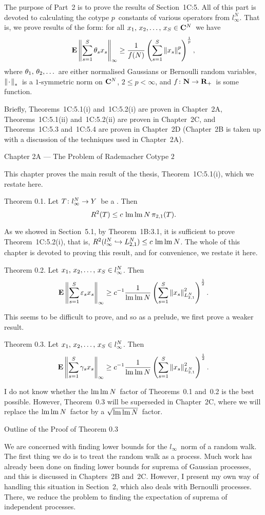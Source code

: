 The purpose of Part~2 is to prove the results of Section~1C:5. All
of this part
is devoted to calculating the cotype $p$\ constants of various operators
from
$l_\infty^N$. That is, we prove results of the form: for all $\xS\in\C^N$\
we have
$$ {\bf E} \left\| \sum_{s=1}^S \theta_s x_s \right\|_\infty \ge {1\over f(N)}
   \left( \sum_{s=1}^S \left\| x_s \right\|_*^p \right)^{1\over p} ,$$
where $\thetalist$\ are either normalised Gaussians or Bernoulli
random
variables, $\left\| \kern0.8pt\cdot\kern0.8pt \right\|_*$\ is a $1$-symmetric norm on ${\bf C}^N$, $2\le
p<\infty$, and $f\colon{\bf N}\to{\bf R}_+$\ is some function.
 
Briefly, Theorems~1C:5.1(i) and~1C:5.2(i) are proven in Chapter~2A,
Theorems~1C:5.1(ii) and~1C:5.2(ii) are proven in Chapter~2C, and
Theorems~1C:5.3 and~1C:5.4 are proven in Chapter~2D (Chapter~2B is
taken up
with a discussion of the techniques used in Chapter~2A).
 
\vfill
\eject
 
\beginsection Chapter 2A --- The Problem of Rademacher Cotype $2$
 
This chapter proves the main result of the thesis,
Theorem~1C:5.1(i), which we restate here.
 
\proclaim Theorem 0.1. Let $T\colon l_\infty^N\to Y$\ be a \blotaBs. Then
$$ R^2(T) \le c \,\mathop{\rm lm}\nolimits\mathop{\rm lm}\nolimits N\, \pi_{2,1}(T) .$$
 
\noindent
As we showed in Section~5.1, by Theorem~1B:3.1, it is sufficient
to prove
Theorem~1C:5.2(i), that is, $R^2( l_\infty^N \hookrightarrow
L_{2,1}^N) \le c\, \mathop{\rm lm}\nolimits\mathop{\rm lm}\nolimits N$. The whole of this chapter is devoted
to proving
this result, and for convenience, we restate it here.
 
\proclaim Theorem 0.2. Let $\xS\in\linftyN$. Then
$$ {\bf E} \left\| \sum_{s=1}^S \varepsilon_s x_s \right\|_\infty
   \ge c^{-1}
   {1\over \mathop{\rm lm}\nolimits\mathop{\rm lm}\nolimits N} \left( \sum_{s=1}^S \left\| x_s \right\|_{L_{2,1}^N}^2 \right)^{1\over2} .$$
 
\noindent
This seems to be difficult to prove, and so as a prelude, we first
prove a
weaker result.
 
\proclaim Theorem 0.3. Let $\xS\in\linftyN$. Then
$$ {\bf E} \left\| \sum_{s=1}^S \gamma_s x_s \right\|_\infty
   \ge c^{-1}
   {1\over \mathop{\rm lm}\nolimits\mathop{\rm lm}\nolimits N} \left( \sum_{s=1}^S \left\| x_s \right\|_{L_{2,1}^N}^2 \right)^{1\over2} .$$
 
I do not know whether the $\mathop{\rm lm}\nolimits\mathop{\rm lm}\nolimits N$\ factor of Theorems~0.1 and~0.2
is the best
possible. However, Theorem~0.3 will be superseded in Chapter~2C,
where we will
replace the $\mathop{\rm lm}\nolimits\mathop{\rm lm}\nolimits N$\ factor by a $\sqrt{\mathop{\rm lm}\nolimits\mathop{\rm lm}\nolimits N}$\ factor.
 
\beginsection Outline of the Proof of Theorem 0.3
 
We are concerned with finding lower bounds for the $l_\infty$\ norm
of a
random walk.
The first thing we do is to treat the random walk as a process.
Much work has already been done on finding lower bounds for suprema
of
Gaussian processes,
and this is discussed in Chapters~2B and~2C.
However, I present my own way of handling this situation
in Section~2, which also deals with Bernoulli processes.
There, we reduce the problem to finding the
expectation of suprema of independent processes.
 
